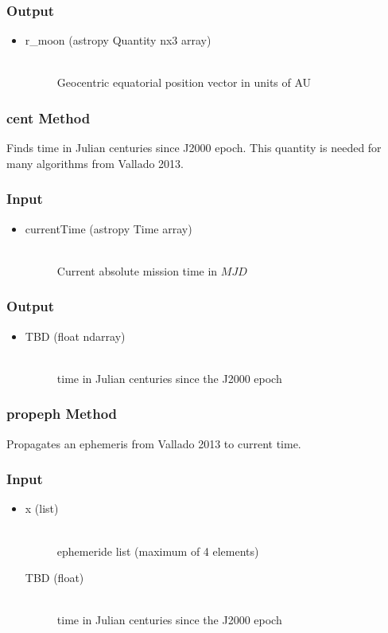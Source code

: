 \documentclass[cleanfoot]{asme2ej}
\begin{document}
\subsubsection*{Output}
\begin{itemize}
\item
\begin{description}
    \item[r\_moon (astropy Quantity nx3 array)] \hfill \\ Geocentric equatorial position vector in units of AU
\end{description}
\end{itemize}

\subsubsection{cent Method} \label{}
Finds time in Julian centuries since J2000 epoch. This quantity is needed for many algorithms from Vallado 2013.
\subsubsection*{Input}
\begin{itemize}
\item
\begin{description}
    \item[currentTime (astropy Time array)] \hfill \\ Current absolute mission time in $MJD$
\end{description}
\end{itemize}
\subsubsection*{Output}
\begin{itemize}
\item
\begin{description}
    \item[TBD (float ndarray)] \hfill \\ time in Julian centuries since the J2000 epoch 
\end{description}
\end{itemize}

\subsubsection{propeph Method} \label{}
Propagates an ephemeris from Vallado 2013 to current time.
\subsubsection*{Input}
\begin{itemize}
\item
\begin{description}
    \item[x (list)] \hfill \\ ephemeride list (maximum of 4 elements)
    \item[TBD (float)] \hfill \\ time in Julian centuries since the J2000 epoch 
\end{description}
\end{itemize}
\end{document}
